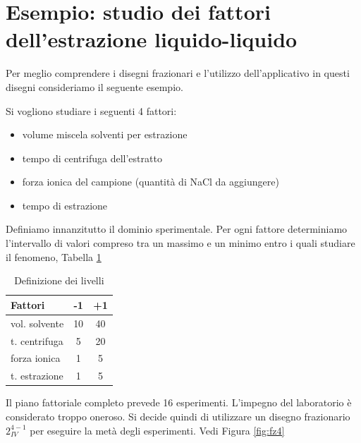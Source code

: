 \documentclass[
  11pt,
]{book}
\begin{document}
\hypertarget{esempio-studio-dei-fattori-dellestrazione-liquido-liquido}{%
\section{Esempio: studio dei fattori dell'estrazione liquido-liquido}\label{esempio-studio-dei-fattori-dellestrazione-liquido-liquido}}

Per meglio comprendere i disegni frazionari e l'utilizzo dell'applicativo in questi disegni consideriamo il seguente esempio.

Si vogliono studiare i seguenti 4 fattori:

\begin{itemize}
\item
  volume miscela solventi per estrazione
\item
  tempo di centrifuga dell'estratto
\item
  forza ionica del campione (quantità di NaCl da aggiungere)
\item
  tempo di estrazione
\end{itemize}

Definiamo innanzitutto il dominio sperimentale. Per ogni fattore determiniamo l'intervallo di valori compreso tra un massimo e un minimo entro i quali studiare il fenomeno, Tabella \ref{tab:fzliv}

\begin{table}

\caption{\label{tab:fzliv}Definizione dei livelli}
\centering
\begin{tabular}[t]{lcc}
\toprule
Fattori & -1 & +1\\
\midrule
vol. solvente & 10 & 40\\
t. centrifuga & 5 & 20\\
forza ionica & 1 & 5\\
t. estrazione & 1 & 5\\
\bottomrule
\end{tabular}
\end{table}

Il piano fattoriale completo prevede 16 esperimenti. L'impegno del laboratorio è considerato troppo oneroso. Si decide quindi di utilizzare un disegno frazionario \(2^{4-1}_{IV}\) per eseguire la metà degli esperimenti. Vedi Figura \ref{fig:fz4}
\end{document}
